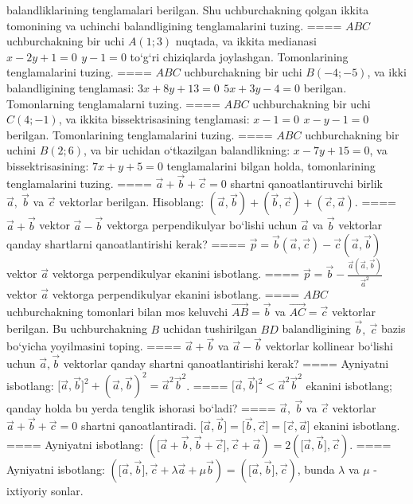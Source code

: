 balandliklarining tenglamalari berilgan. Shu uchburchakning qolgan ikkita
tomonining va uchinchi balandligining tenglamalarini tuzing.
====
$ABC$ uchburchakning bir uchi \(A (1;3) \) nuqtada,
va ikkita medianasi \(x - 2y + 1 = 0\,\ y - 1 = 0\) to‘g‘ri chiziqlarda
joylashgan. Tomonlarining tenglamalarini tuzing.
====
$ABC$ uchburchakning bir uchi \(B (- 4; - 5) \),
va ikki balandligining tenglamasi:
\(3x + 8y + 13 = 0\,\ 5x + 3y - 4 = 0\) berilgan. Tomonlarning
tenglamalarni tuzing.
====
$ABC$ uchburchakning bir uchi \(C (4; - 1) \), va
ikkita bissektrisasining tenglamasi: \(x - 1 = 0\,\ x - y - 1 = 0\)
berilgan. Tomonlarining tenglamalarini tuzing.
====
$ABC$ uchburchakning bir uchini \(B (2;6) \), va
bir uchidan o‘tkazilgan balandlikning: \(x - 7y + 15 = 0\), va
bissektrisasining: \(7x + y + 5 = 0\) tenglamalarini bilgan holda,
tomonlarining tenglamalarini tuzing.
====
\(\vec{a} + \vec{b} + \vec{c} = 0\) shartni qanoatlantiruvchi birlik \(\vec{a},\ \vec{b}\) va \(\vec{c}\) vektorlar berilgan. Hisoblang: \(\left(\vec{a},\vec{b} \right) + \left(\vec{b},\vec{c} \right) + \left(\vec{c},\vec{a} \right) \).
====
\(\vec{a} + \vec{b}\) vektor \(\vec{a} - \vec{b}\) vektorga perpendikulyar bo‘lishi uchun \(\vec{a}\) va \(\vec{b}\) vektorlar qanday shartlarni qanoatlantirishi kerak?
====
\(\vec{p} = \vec{b} (\vec{a},\vec{c}) - \vec{c} (\vec{a},\vec{b}) \) vektor \(\vec{a}\) vektorga perpendikulyar ekanini isbotlang.
====
\(\vec{p} = \vec{b} - \frac{\vec{a} (\vec{a},\vec{b}) }{{\vec{a}}^{2}}\) vektor \(\vec{a}\) vektorga perpendikulyar ekanini isbotlang.
====
\(ABC\) uchburchakning tomonlari bilan mos keluvchi \(\vec{AB} = \vec{b}\) va \(\vec{AC} = \vec{c}\) vektorlar berilgan. Bu uchburchakning \(B\) uchidan tushirilgan \(BD\) balandligining \(\vec{b},\ \vec{c}\) bazis bo‘yicha yoyilmasini toping.
====
\(\vec{a}+\vec{b}\) va \(\vec{a} - \vec{b}\) vektorlar kollinear bo‘lishi uchun \(\vec{a},\vec{b}\) vektorlar qanday shartni qanoatlantirishi kerak?
====
Ayniyatni isbotlang: \(\lbrack\vec{a},\vec{b}\rbrack^{2} + (\vec{a},\vec{b}) ^{2} = {\vec{a}}^{2}{\vec{b}}^{2}\).
====
\(\lbrack\vec{a},\vec{b}\rbrack^{2} < {\vec{a}}^{2}{\vec{b}}^{2}\) ekanini isbotlang; qanday holda bu yerda tenglik ishorasi bo‘ladi?
====
\(\vec{a},\ \vec{b}\) va \(\vec{c}\) vektorlar \(\vec{a} + \vec{b} + \vec{c} = 0\) shartni qanoatlantiradi. \(\lbrack\vec{a},\vec{b}\rbrack = \lbrack\vec{b},\vec{c}\rbrack = \lbrack\vec{c},\vec{a}\rbrack\) ekanini isbotlang.
====
Ayniyatni isbotlang: \((\lbrack\vec{a} + \vec{b},\vec{b} + \vec{c}\rbrack,\vec{c} + \vec{a}) = 2 (\lbrack\vec{a},\vec{b}\rbrack,\vec{c}) \).
====
Ayniyatni isbotlang: \((\lbrack\vec{a},\vec{b}\rbrack,\vec{c} + \lambda\vec{a} + \mu\vec{b}) = (\lbrack\vec{a},\vec{b}\rbrack,\vec{c}) \), bunda \(\lambda\) va \(\mu\) - ixtiyoriy sonlar.